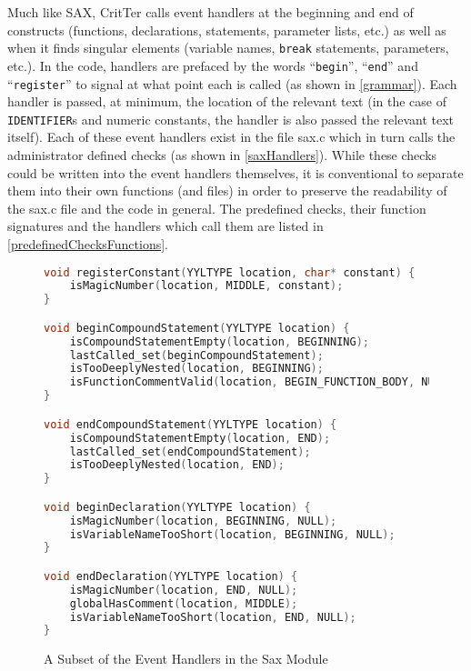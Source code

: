 \documentclass[12pt]{report}
\newcommand{\programName}{CritTer\xspace}
\begin{document}
Much like SAX, \programName calls event handlers at the beginning and end of constructs (functions, 
declarations, statements, parameter lists, etc.) as well as when it finds singular elements (variable 
names, \lstinline{break} statements, parameters, etc.). In the code, handlers are prefaced by the words 
``\lstinline{begin}'', ``\lstinline{end}'' and ``\lstinline{register}'' to signal at what point each is called (as 
shown in \autoref{grammar}). Each handler is passed, at minimum, the location of the relevant text (in 
the case of \lstinline{IDENTIFIER}s and numeric constants, the handler is also passed the relevant 
text itself). Each of these event handlers exist in the file sax.c which in turn calls the administrator 
defined checks (as shown in \autoref{saxHandlers}). While these checks could be written into the event 
handlers themselves, it is conventional to separate them into their own functions (and files) in order to 
preserve the readability of the sax.c file and the code in general. The predefined checks, their function 
signatures and the handlers which call them are listed in \autoref{predefinedChecksFunctions}.

\begin{figure}
\begin{lstlisting}[language=C]
void registerConstant(YYLTYPE location, char* constant) {
	isMagicNumber(location, MIDDLE, constant);
}

void beginCompoundStatement(YYLTYPE location) {
	isCompoundStatementEmpty(location, BEGINNING);
	lastCalled_set(beginCompoundStatement);
	isTooDeeplyNested(location, BEGINNING);
	isFunctionCommentValid(location, BEGIN_FUNCTION_BODY, NULL);
}

void endCompoundStatement(YYLTYPE location) {
	isCompoundStatementEmpty(location, END);
	lastCalled_set(endCompoundStatement);
	isTooDeeplyNested(location, END);
}

void beginDeclaration(YYLTYPE location) {
	isMagicNumber(location, BEGINNING, NULL);
	isVariableNameTooShort(location, BEGINNING, NULL);
}

void endDeclaration(YYLTYPE location) {
	isMagicNumber(location, END, NULL);
	globalHasComment(location, MIDDLE);
	isVariableNameTooShort(location, END, NULL);
}
\end{lstlisting}
\caption{A Subset of the Event Handlers in the Sax Module}
\label{saxHandlers}
\end{figure}
\end{document}
